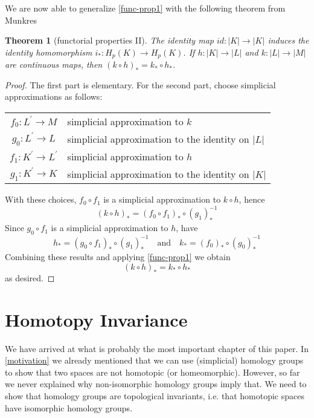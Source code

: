 \documentclass[toc=bib, headinclude]{scrartcl}
\theoremstyle{plain}
\newtheorem{theorem}{Theorem}[section]
\theoremstyle{definition}
\theoremstyle{remark}
\newcommand{\qandq}{\quad \text{and} \quad}
\begin{document}
We are now able to generalize \autoref{func-prop1} with the following theorem from Munkres \parencite[p. 101]{mu}
\begin{theorem}[functorial properties II]\label{func-prop2}
	The identity map $id: |K|\to |K|$ induces the identity homomorphism $i_\ast: H_p(K)\to H_p(K)$. If $h:|K|\to|L|$ and $k:|L|\to |M|$ are continuous maps, then $(k\circ h)_\ast=k_\ast\circ h_\ast$.
\end{theorem}
\begin{proof}
	The first part is elementary. For the second part, choose simplicial approximations as follows:
	
	\begin{tabular}{c|>{simplicial approximation to }l}
		$f_0: L^\prime\to M$&  $k$\\
		$g_0: L^\prime\to L$& the identity on $|L|$\\
		$f_1: K^\prime\to L^\prime$& $h$\\
		$g_1: K^\prime\to K$& the identity on $|K|$
	\end{tabular}

\begin{center}
	
\end{center}
With these choices, $f_0\circ f_1$ is a simplicial approximation to $k\circ h$, hence
\[
(k\circ h)_\ast=(f_0\circ f_1)_\ast\circ(g_1)_\ast^{-1}
\]
Since $g_0\circ f_1$ is a simplicial approximation to $h$, have
\[
h_\ast=(g_0\circ f_1)_\ast\circ(g_1)_\ast^{-1}\qandq k_\ast=(f_0)_\ast\circ(g_0)_\ast^{-1}
\]
Combining these results and applying \autoref{func-prop1}
we obtain 
\[
(k\circ h)_\ast=k_\ast\circ h_\ast
\]
as desired.


\end{proof}

\section{Homotopy Invariance}

We have arrived at what is probably the most important chapter of this paper. In \autoref{motivation} we already mentioned that we can use (simplicial) homology groups to show that two spaces are not homotopic (or homeomorphic). However, so far we never explained why non-isomorphic homology groups imply that. We need to show that homology groups are topological invariants, i.e. that homotopic spaces have isomorphic homology groups.
\end{document}
